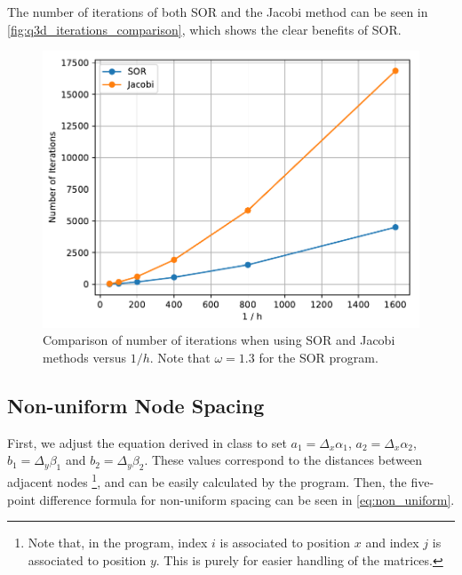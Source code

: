 \documentclass[a4paper,titlepage]{article}
\begin{document}
	The number of iterations of both SOR and the Jacobi method can be seen in \autoref{fig:q3d_iterations_comparison}, which shows the clear benefits of SOR.

	\begin{figure}[!htb]
		\centering
		\includegraphics[width=\columnwidth]{plots/q3d_iterations_comparison.pdf}
		\caption
		{Comparison of number of iterations when using SOR and Jacobi methods versus $1/h$. Note that $\omega=1.3$ for the SOR program.}
		\label{fig:q3d_iterations_comparison}
	\end{figure}
	
	\subsection{Non-uniform Node Spacing}
	
	First, we adjust the equation derived in class to set $a_1 = \Delta_x\alpha_1$, $a_2 = \Delta_x\alpha_2$, $b_1 = \Delta_y\beta_1$ and $b_2 = \Delta_y\beta_2$. These values correspond to the distances between adjacent nodes \footnote{Note that, in the program, index $i$ is associated to position $x$ and index $j$ is associated to position $y$. This is purely for easier handling of the matrices.}, and can be easily calculated by the program. Then, the five-point difference formula for non-uniform spacing can be seen in \autoref{eq:non_uniform}.
	
\end{document}
